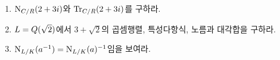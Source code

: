 \begin{checkpoint}
\begin{enumerate}[label=(\alph*)]
  \item $\operatorname{N}_{C/R}(2+3i)$와 $\operatorname{Tr}_{C/R}(2+3i)$를 구하라.
  \item $L=Q(\sqrt2)$에서 $3+\sqrt2$의 곱셈행렬, 특성다항식,
  노름과 대각합을 구하라.
  \item $\operatorname{N}_{L/K}(a^{-1})=\operatorname{N}_{L/K}(a)^{-1}$임을 보여라.
\end{enumerate}
\end{checkpoint}

